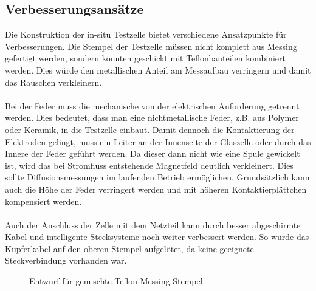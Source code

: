 \documentclass[a4paper, 11pt, headsepline,footsepline,twoside,abstract]{scrbook}
\begin{document}
\subsection{Verbesserungsansätze}
\label{verb_testzelle}
Die Konstruktion der in-situ Testzelle bietet verschiedene Ansatzpunkte für Verbesserungen. Die Stempel der Testzelle müssen nicht komplett aus Messing gefertigt werden, sondern könnten geschickt mit Teflonbauteilen kombiniert werden. Dies würde den metallischen Anteil am Messaufbau verringern und damit das Rauschen verkleinern.
\\\\
Bei der Feder muss die mechanische von der elektrischen Anforderung getrennt werden. Dies bedeutet, dass man eine nichtmetallische Feder, z.B. aus Polymer oder Keramik, in die Testzelle einbaut. Damit dennoch die Kontaktierung der Elektroden gelingt, muss ein Leiter an der Innenseite der Glaszelle oder durch das Innere der Feder geführt werden. Da dieser dann nicht wie eine Spule gewickelt ist, wird das bei Stromfluss entstehende Magnetfeld deutlich verkleinert. Dies sollte Diffusionsmessungen im laufenden Betrieb ermöglichen. Grundsätzlich kann auch die Höhe der Feder verringert werden und mit höheren Kontaktierplättchen kompensiert werden.
\\\\
Auch der Anschluss der Zelle mit dem Netzteil kann durch besser abgeschirmte Kabel und intelligente Stecksysteme noch weiter verbessert werden. So wurde das Kupferkabel auf den oberen Stempel aufgelötet, da keine geeignete Steckverbindung vorhanden war.
\begin{figure}
   \centering
       \vspace{10mm}
       \vspace{6mm}
	\caption{Entwurf für gemischte Teflon-Messing-Stempel}
   	\label{stempel_v2}
\end{figure} 
\end{document}
